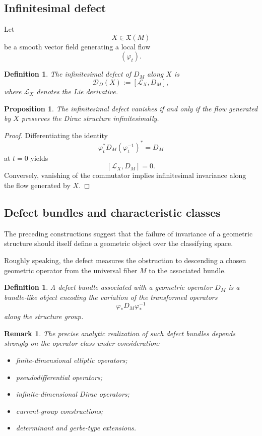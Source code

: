 \documentclass[11pt]{amsart}
\newtheorem{proposition}[theorem]{Proposition}
\newtheorem{definition}[theorem]{Definition}
\newtheorem{remark}[theorem]{Remark}
\begin{document}
\subsection{Infinitesimal defect}

Let
\[
X\in\mathfrak X(M)
\]
be a smooth vector field generating a local flow
\[
(\varphi_t).
\]

\begin{definition}
The infinitesimal defect of \(D_M\) along \(X\) is
\[
\mathcal D_D(X)
:=
[\mathcal L_X,D_M],
\]
where \(\mathcal L_X\) denotes the Lie derivative.
\end{definition}

\begin{proposition}
The infinitesimal defect vanishes if and only if the flow generated by \(X\)
preserves the Dirac structure infinitesimally.
\end{proposition}

\begin{proof}
Differentiating the identity
\[
\varphi_t^*D_M(\varphi_t^{-1})^*
=
D_M
\]
at \(t=0\) yields
\[
[\mathcal L_X,D_M]=0.
\]
Conversely, vanishing of the commutator implies infinitesimal invariance along
the flow generated by \(X\).
\end{proof}

\subsection{Defect bundles and characteristic classes}

The preceding constructions suggest that the failure of invariance of a
geometric structure should itself define a geometric object over the
classifying space.

Roughly speaking, the defect measures the obstruction to descending a chosen
geometric operator from the universal fiber \(M\) to the associated bundle.

\begin{definition}
A defect bundle associated with a geometric operator \(D_M\) is a bundle-like
object encoding the variation of the transformed operators
\[
\varphi_*D_M\varphi_*^{-1}
\]
along the structure group.
\end{definition}

\begin{remark}
The precise analytic realization of such defect bundles depends strongly on
the operator class under consideration:
\begin{itemize}
\item finite-dimensional elliptic operators;
\item pseudodifferential operators;
\item infinite-dimensional Dirac operators;
\item current-group constructions;
\item determinant and gerbe-type extensions.
\end{itemize}
\end{remark}
\end{document}
